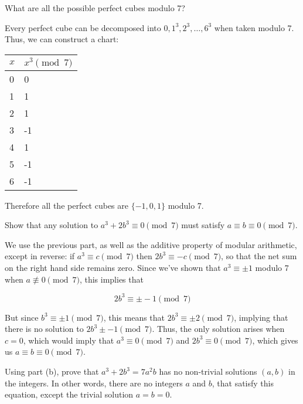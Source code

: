 \documentclass[11pt]{article}
\begin{document}
\begin{Parts}

\Part What are all the possible perfect cubes modulo 7?

\begin{solution}
  Every perfect cube can be decomposed into $0, 1^3, 2^3, \dots, 6^3$ when taken modulo 7. Thus, we can construct a chart: 

  \begin{center}
    \begin{tabular}{l|l}
      $x$ & $x^3 \pmod{7}$ \\ \hline
      0   & 0              \\
      1   & 1              \\
      2   & 1              \\
      3   & -1             \\
      4   & 1              \\
      5   & -1             \\
      6   & -1            
      \end{tabular}
  \end{center}

  Therefore all the perfect cubes are $\{-1, 0, 1\}$ modulo 7.


\end{solution}
\Part Show that any solution to $a^3 + 2b^3 \equiv 0 \pmod{7}$ must satisfy $a \equiv b \equiv 0 \pmod{7}$.


\begin{solution}
  We use the previous part, as well as the additive property of modular arithmetic, except in reverse: if $a^3 \equiv c \pmod 7$ then $2b^3 \equiv -c \pmod 7$, so that the net sum on the right hand side remains zero. Since we've shown that $a^3 \equiv \pm 1$ modulo 7 when $a \not \equiv 0 \pmod 7$, this implies that

  \[ 2b^3 \equiv \pm -1 \pmod 7\] 

  But since $b^3 \equiv \pm 1 \pmod 7$, this means that $2b^3 \equiv \pm 2 \pmod 7$, implying that there is no solution to $2b^3 \pm -1 \pmod 7$. Thus, the only solution arises when $c = 0$, which would imply that $a^3 \equiv 0 \pmod 7$ and $2b^3 \equiv 0 \pmod 7$, which gives us $a \equiv b \equiv 0 \pmod 7$.
\end{solution}

\Part Using part (b), prove that $a^3 + 2b^3 = 7a^2b$ has no non-trivial solutions $(a, b)$ in the integers. In other words, there are no integers $a$ and $b$, that satisfy this equation, except the trivial solution $a=b=0$.


\end{Parts}
\end{document}
